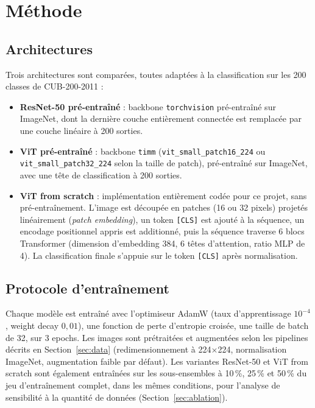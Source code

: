 \section{Méthode}
\label{sec:methodology}

\subsection{Architectures}

Trois architectures sont comparées, toutes adaptées à la classification
sur les 200 classes de CUB-200-2011 :

\begin{itemize}
  \item \textbf{ResNet-50 pré-entraîné} : backbone \texttt{torchvision}
    pré-entraîné sur ImageNet, dont la dernière couche entièrement
    connectée est remplacée par une couche linéaire à 200 sorties.
  \item \textbf{ViT pré-entraîné} : backbone \texttt{timm}
    (\texttt{vit\_small\_patch16\_224} ou \texttt{vit\_small\_patch32\_224}
    selon la taille de patch), pré-entraîné sur ImageNet, avec une tête
    de classification à 200 sorties.
  \item \textbf{ViT from scratch} : implémentation entièrement codée pour
    ce projet, sans pré-entraînement. L'image est découpée en patches
    (16 ou 32 pixels) projetés linéairement (\emph{patch embedding}), un
    token \texttt{[CLS]} est ajouté à la séquence, un encodage
    positionnel appris est additionné, puis la séquence traverse 6
    blocs Transformer (dimension d'embedding 384, 6 têtes d'attention,
    ratio MLP de 4). La classification finale s'appuie sur le token
    \texttt{[CLS]} après normalisation.
\end{itemize}

\subsection{Protocole d'entraînement}

Chaque modèle est entraîné avec l'optimiseur AdamW (taux d'apprentissage
$10^{-4}$, weight decay $0{,}01$), une fonction de perte d'entropie
croisée, une taille de batch de 32, sur 3 epochs. Les images sont
prétraitées et augmentées selon les pipelines décrits en
Section~\ref{sec:data} (redimensionnement à 224$\times$224,
normalisation ImageNet, augmentation faible par défaut). Les
variantes ResNet-50 et ViT from scratch sont également entraînées sur
les sous-ensembles à 10\,\%, 25\,\% et 50\,\% du jeu d'entraînement
complet, dans les mêmes conditions, pour l'analyse de sensibilité à la
quantité de données (Section~\ref{sec:ablation}).

